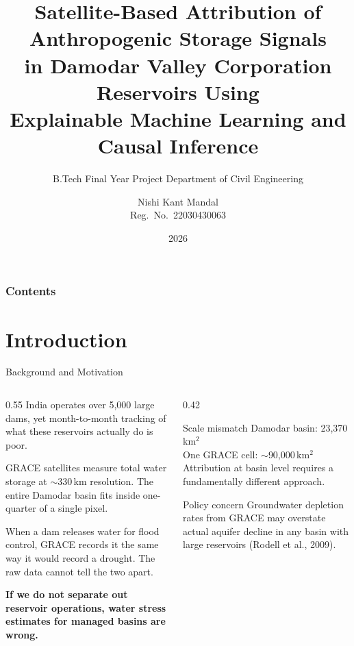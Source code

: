 \documentclass[10pt]{beamer}
\title[DVC Reservoir Attribution]{%
  Satellite-Based Attribution of Anthropogenic Storage Signals\\
  in Damodar Valley Corporation Reservoirs Using\\
  Explainable Machine Learning and Causal Inference}
\subtitle{B.Tech Final Year Project\;\textbar\;%
  Department of Civil Engineering}
\author[N.\,K.\,Mandal]{Nishi Kant Mandal\\[4pt]
  {\small Reg.\ No.\ 22030430063}}
\institute[BIT Sindri]{%
  Supervisor: Dr.\ Maya Rajnarayan Ray\\
  Associate Professor, Civil Engineering\\[2pt]
  Birsa Institute of Technology, Sindri, Dhanbad}
\date[2026]{2026}
\begin{document}
\frame{\titlepage}
\begin{frame}
\frametitle{Contents}
\tableofcontents
\end{frame}


\section{Introduction}

\begin{frame}{Background and Motivation}
  \begin{columns}[T]
    \begin{column}{0.55\textwidth}
      \small
      India operates over 5,000 large dams, yet month-to-month
      tracking of what these reservoirs actually do is poor.

      \medskip
      GRACE satellites measure total water storage at
      $\sim$330\,km resolution. The entire Damodar basin
      fits inside one-quarter of a single pixel.

      \medskip
      When a dam releases water for flood control, GRACE
      records it the same way it would record a drought.
      The raw data cannot tell the two apart.

      \medskip
      \textbf{If we do not separate out reservoir operations,
      water stress estimates for managed basins are wrong.}
    \end{column}
    \begin{column}{0.42\textwidth}
      \begin{block}{Scale mismatch}
        \footnotesize
        Damodar basin: 23,370\,km$^2$\\
        One GRACE cell: $\sim$90,000\,km$^2$\\[4pt]
        Attribution at basin level requires
        a fundamentally different approach.
      \end{block}
      \vspace{4pt}
      \begin{alertblock}{Policy concern}
        \footnotesize
        Groundwater depletion rates from GRACE
        may overstate actual aquifer decline in
        any basin with large reservoirs
        (Rodell et al., 2009).
      \end{alertblock}
    \end{column}
  \end{columns}
\end{frame}
\end{document}
